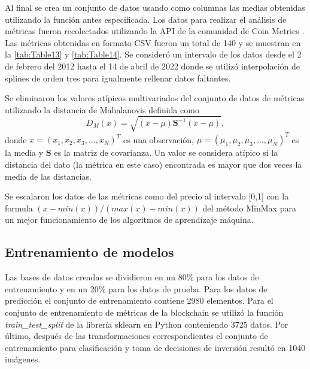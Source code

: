 Al final se crea un conjunto de datos usando como columnas las medias obtenidas utilizando la función antes especificada. 
Los datos para realizar el análisis de métricas fueron recolectados utilizando la API de la comunidad de Coin Metrics \parencite{APIBasics}. Las métricas obtenidas en formato CSV fueron un total de 140 y se muestran en la \cref{tab:Table13} y \cref{tab:Table14}. Se consideró un intervalo de los datos desde el 2 de febrero del 2012 hasta el 14 de abril de 2022 donde se utilizó interpolación de splines de orden tres para igualmente rellenar datos faltantes.

Se eliminaron los valores atípicos multivariados del conjunto de datos de métricas utilizando la distancia de  Mahalanovis definida como
\[ D_M(x) = \sqrt{(x-\mu)\textbf{S}^{-1}(x-\mu)}, \]
donde $x = (x_1,x_2,x_3,...,x_N)^T$ es una observación, $\mu = (\mu_1,\mu_2,\mu_3,...,\mu_N)^T$ es la media y $\textbf{S}$ es la matriz de covarianza. Un valor se considera atípico si la distancia del dato (la métrica en este caso) encontrada es mayor que dos veces la media de las distancias.

Se escalaron los datos de las métricas como del precio al intervalo [0,1] con la formula $(x-min(x))/(max(x)-min(x))$ del método MinMax para un mejor funcionamiento de los algoritmos de aprendizaje máquina. 	 

\subsection{Entrenamiento de modelos}

Las bases de datos creadas se dividieron en un 80\% para los datos de entrenamiento y en un 20\% para los datos de prueba. Para los datos de predicción el conjunto de entrenamiento contiene 2980 elementos. Para el conjunto de entrenamiento de métricas de la blockchain se utilizó la función \emph{train\_test\_split} de la librería sklearn en Python conteniendo 3725 datos. Por último, después de las transformaciones correspondientes el conjunto de entrenamiento para clasificación y toma de decisiones de inversión resultó en 1040 imágenes.

